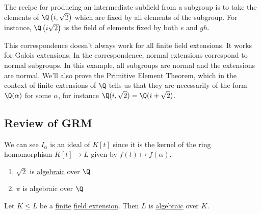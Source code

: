 \documentclass{article}
\begin{document}
The recipe for producing an intermediate subfield from a subgroup is to take the elements of $\Q\left(i, \sqrt{2}\right)$ which are fixed by all elements of the subgroup.
For instance, $\Q\left(i \sqrt{2}\right)$ is the field of elements fixed by both $e$ and $gh$.

This correspondence doesn't always work for all finite field extensions.  It works for Galois extensions.
In the correspondence, normal extensions correspond to normal subgroups.
In this example, all subgroups are normal and the extensions are normal.
We'll also prove the Primitive Element Theorem, which in the context of finite extensions of $\Q$ tells us that they are necessarily of the form $\Q(\alpha)$ for some $\alpha$, for instance $\Q(i, \sqrt{2}) = \Q(i + \sqrt{2})$.

\subsection{Review of GRM}

\begin{remark}
    We can see $I_\alpha$ is an ideal of $K[t]$ since it is the kernel of the ring homomorphism $K[t] \to L$ given by $f(t) \mapsto f(\alpha)$.
\end{remark}

\begin{eg}
    \leavevmode
    \begin{enumerate}[label=(\roman*)]
        \item $\sqrt{2}$ is \hyperlink{def:algebraic}{algebraic} over $\Q$
        \item $\pi$ is algebraic over $\Q$
    \end{enumerate}
\end{eg}

\begin{nlemma}\label{lem:1.5}
    Let $K \leq L$ be a \hyperlink{def:degreeOfFieldExt}{finite} \hyperlink{def:fieldExt}{field extension}. Then $L$ is \hyperlink{def:algebraic}{algebraic} over $K$.
\end{nlemma}
\end{document}
